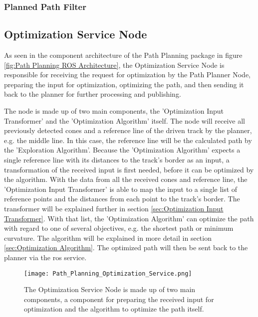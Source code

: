 \subsubsection{Planned Path Filter} \label{sec:Planned Path Filter}
\lipsum[1]

\subsection{Optimization Service Node} \label{sec:Optimization Service Node}
As seen in the component architecture of the Path Planning package in figure \ref{fig:Path Planning ROS Architecture}, the Optimization Service Node is responsible for receiving the request for optimization by the Path Planner Node, preparing the input for optimization, optimizing the path, and then sending it back to the planner for further processing and publishing.

The node is made up of two main components, the 'Optimization Input Transformer' and the 'Optimization Algorithm' itself. The node will receive all previously detected cones and a reference line of the driven track by the planner, e.g. the middle line. In this case, the reference line will be the calculated path by the 'Exploration Algorithm'. Because the 'Optimization Algorithm' expects a single reference line with its distances to the track's border as an input, a transformation of the received input is first needed, before it can be optimized by the algorithm. With the data from all the received cones and reference line, the 'Optimization Input Transformer' is able to map the input to a single list of reference points and the distances from each point to the track's border. The transformer will be explained further in section \ref{sec:Optimization Input Transformer}. With that list, the 'Optimization Algorithm' can optimize the path with regard to one of several objectives, e.g. the shortest path or minimum curvature. The algorithm will be explained in more detail in section \ref{sec:Optimization Algorithm}. The optimized path will then be sent back to the planner via the  \acrshort{ros} service.
\begin{figure}[H]
    \centering
    \texttt{[image: Path\_Planning\_Optimization\_Service.png]}
    \caption{The Optimization Service Node is made up of two main components, a component for preparing the received input for optimization and the algorithm to optimize the path itself.}
    \label{fig:Path Planning Optimization Service Node}
\end{figure}

